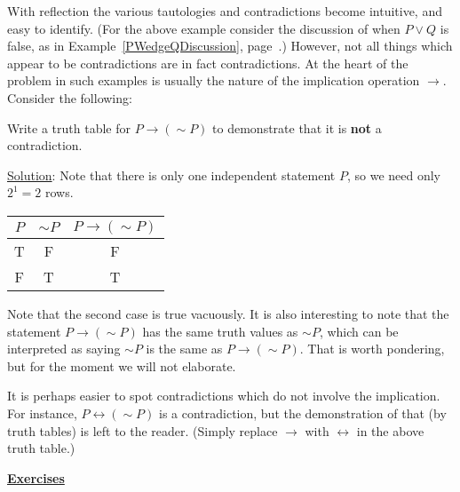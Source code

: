 With reflection the various tautologies and contradictions
become intuitive, and easy to identify.  (For the above example
consider the discussion of when $P\vee Q$ is false, 
as in Example~\ref{PWedgeQDiscussion}, page~\pageref{PWedgeQDiscussion}.)
However, not all things which appear to be contradictions are
in fact contradictions.  At the heart of the problem in such
examples is usually the nature of the implication operation
$\longrightarrow$.  Consider the following:


\bex Write a truth table for $P\longrightarrow(\sim P)$ to demonstrate
that it is {\bf not} a contradiction.

\underline{Solution}: Note that there is only one independent statement
$P$, so we need only $2^1=2$ rows.

\begin{center}
\begin{tabular}{|c||c|c|}
\hline$P$&$\sim P$&$P\longrightarrow(\sim P)$\\
\hline
T&F&F\\
F&T&T\\
\hline
\end{tabular}
\end{center}
\eex
Note that the second case is true vacuously.  It is also interesting to note
that the statement $P\longrightarrow(\sim P)$ has the same truth values as
$\sim P$, which can be interpreted as saying $\sim P$ is the same
as $P\longrightarrow(\sim P)$.  That is worth pondering, but for the
moment we will not elaborate.

It is perhaps 
easier to spot contradictions which do not involve the implication.
For instance, $P\longleftrightarrow(\sim P)$ is a contradiction,
but the demonstration of that (by truth tables) is left to the reader.
(Simply replace $\longrightarrow$ with $\longleftrightarrow$ in the
above truth table.)



\newpage
\begin{center}
\underline{\Large{\bf Exercises}}\end{center}

